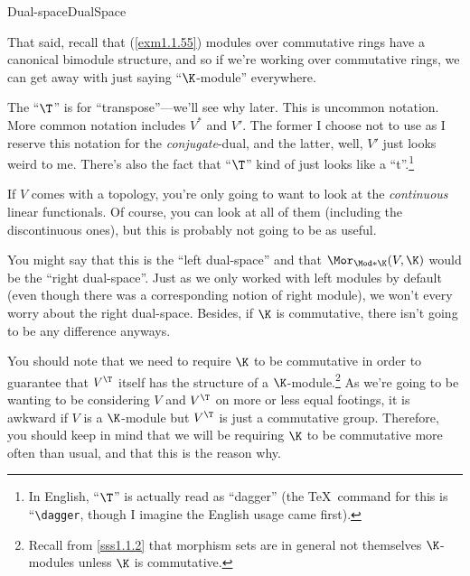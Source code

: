 \begin{dfn}{Dual-space}{DualSpace}
\begin{rmk}
		That said, recall that (\cref{exm1.1.55}) modules over commutative rings have a canonical bimodule structure, and so if we're working over commutative rings, we can get away with just saying ``$\K$-module'' everywhere.
	\end{rmk}
	\begin{rmk}
		The ``$\T$'' is for ``transpose''---we'll see why later.  This is uncommon notation.  More common notation includes $V^*$ and $V'$.  The former I choose not to use as I reserve this notation for the \emph{conjugate}-dual, and the latter, well, $V'$ just looks weird to me.  There's also the fact that ``$\T$'' kind of just looks like a ``t''.\footnote{In English, ``$\T$'' is actually read as ``dagger'' (the \TeX \ command for this is ``\texttt{\textbackslash dagger}, though I imagine the English usage came first).}
	\end{rmk}
	\begin{rmk}
		If $V$ comes with a topology, you're only going to want to look at the \emph{continuous} linear functionals.  Of course, you can look at all of them (including the discontinuous ones), but this is probably not going to be as useful.
	\end{rmk}
	\begin{rmk}
		You might say that this is the ``left dual-space'' and that $\Mor _{\Mod*{\K}}(V,\K )$ would be the ``right dual-space''.  Just as we only worked with left modules by default (even though there was a corresponding notion of right module), we won't every worry about the right dual-space.  Besides, if $\K$ is commutative, there isn't going to be any difference anyways.
	\end{rmk}
\end{dfn}
You should note that we need to require $\K$ to be commutative in order to guarantee that $V^{\T}$ itself has the structure of a $\K$-module.\footnote{Recall from \cref{sss1.1.2} that morphism sets are in general not themselves $\K$-modules unless $\K$ is commutative.}  As we're going to be wanting to be considering $V$ and $V^{\T}$ on more or less equal footings, it is awkward if $V$ is a $\K$-module but $V^{\T}$ is just a commutative group.  Therefore, you should keep in mind that we will be requiring $\K$ to be commutative more often than usual, and that this is the reason why.

